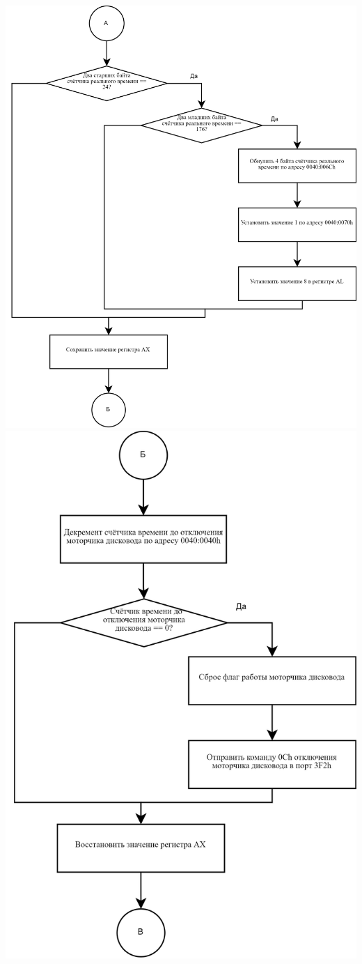 \documentclass[a4paper,14pt]{article}
\begin{document}
\begin{flushright}
	\includegraphics[height=0.8\textheight]{img/int_8h-2.png}
	\includegraphics[height=0.8\textheight]{img/int_8h-3.png}

\end{flushright}
\end{document}
